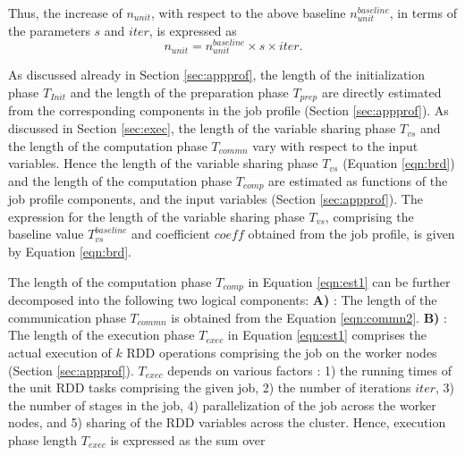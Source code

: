 \documentclass[conference]{IEEEtran}
\begin{document}
 Thus, the increase of  $\mathit{n_{unit}}$, with respect to the above baseline $\mathit{n_{\mathit{unit}}^{\mathit{baseline}}}$, in terms
  of the parameters $s$ and $\mathit{iter}$, is expressed as
 \begin{equation}\label{eqn:s}
\mathit{n_{unit}} = \mathit{n_{\mathit{unit}}^{baseline}} \times s \times \mathit{iter}.
 \end{equation}
\par As discussed already in Section \ref{sec:appprof}, the length of the initialization phase $\mathit{T_{\mathit{Init}}}$ and the length of the
  preparation phase ${T_{\mathit{prep}}}$ are directly estimated from the corresponding components in the job
  profile (Section \ref{sec:appprof}). As discussed in Section \ref{sec:exec}, the length of the
  variable sharing phase $\mathit{T_{\mathit{vs}}}$ and the length of the computation phase $\mathit{T_{\mathit{commn}}}$
  vary with respect to the input variables. Hence
  the length of the variable sharing phase $\mathit{T_{\mathit{vs}}}$ (Equation \ref{eqn:brd})
  and the length of the computation phase $\mathit{T_{\mathit{comp}}}$ are estimated as functions of the job profile components,
   and the input variables (Section
  \ref{sec:appprof}). The expression for the length of the variable sharing phase $\mathit{T_{\mathit{vs}}}$, comprising the baseline value
 $\mathit{T_{\mathit{vs}}^{\mathit{baseline}}}$ and coefficient $\mathit{\mathit{coeff}}$ obtained from the job profile, is  given by
  Equation \ref{eqn:brd}.
  \par The length of the computation phase $\mathit{T_{\mathit{comp}}}$ in Equation
  \ref{eqn:est1} can be further decomposed into the following two logical components:
\textbf{A)} : The length of the communication phase $\mathit{T_{\mathit{commn}}}$ is obtained from the Equation \ref{eqn:commn2}. \textbf{B)} : The length of the execution
 phase $\mathit{T_{\mathit{exec}}}$ in Equation \ref{eqn:est1} comprises the actual execution of $k$ RDD operations
 comprising the job on the worker nodes (Section \ref{sec:appprof}). $\mathit{T_{\mathit{exec}}}$ depends on various factors \cite{Zaharia:2012:RDD:2228298.2228301}: 1) the running times of the unit RDD tasks
 comprising the given job, 2) the number of iterations $\mathit{iter}$, 3) the number of stages in the job,
 4) parallelization of  the job across the worker nodes, and 5) sharing of the RDD variables across the cluster. Hence, execution phase length $\mathit{T_{\mathit{exec}}}$ is expressed as the sum  over
\end{document}
